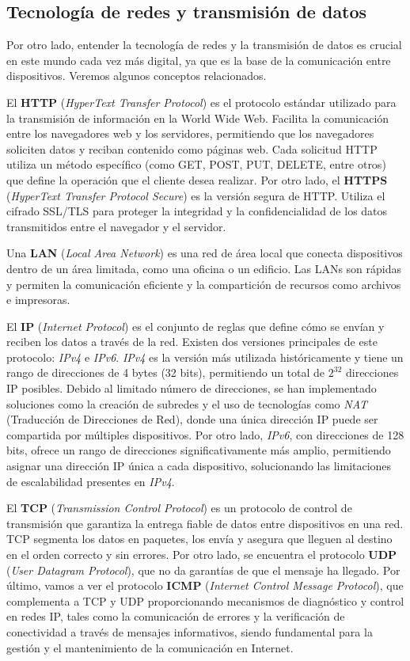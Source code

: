 \subsection{Tecnología de redes y transmisión de datos}

Por otro lado, entender la tecnología de redes y la transmisión de datos es crucial en este mundo cada vez más digital, ya que es la base de la comunicación entre dispositivos. Veremos algunos conceptos relacionados.

El \textbf{HTTP} (\textit{HyperText Transfer Protocol}) es el protocolo estándar utilizado para la transmisión de información en la World Wide Web. Facilita la comunicación entre los navegadores web y los servidores, permitiendo que los navegadores soliciten datos y reciban contenido como páginas web. Cada solicitud HTTP utiliza un método específico (como GET, POST, PUT, DELETE, entre otros) que define la operación que el cliente desea realizar. Por otro lado, el \textbf{HTTPS} (\textit{HyperText Transfer Protocol Secure}) es la versión segura de HTTP. Utiliza el cifrado SSL/TLS para proteger la integridad y la confidencialidad de los datos transmitidos entre el navegador y el servidor.

Una \textbf{LAN} (\textit{Local Area Network}) es una red de área local que conecta dispositivos dentro de un área limitada, como una oficina o un edificio. Las LANs son rápidas y permiten la comunicación eficiente y la compartición de recursos como archivos e impresoras.

El \textbf{IP} (\textit{Internet Protocol}) es el conjunto de reglas que define cómo se envían y reciben los datos a través de la red. Existen dos versiones principales de este protocolo: \textit{IPv4} e \textit{IPv6}. \textit{IPv4} es la versión más utilizada históricamente y tiene un rango de direcciones de 4 bytes (32 bits), permitiendo un total de $2^{32}$ direcciones IP posibles. Debido al limitado número de direcciones, se han implementado soluciones como la creación de subredes y el uso de tecnologías como \textit{NAT} (Traducción de Direcciones de Red), donde una única dirección IP puede ser compartida por múltiples dispositivos. Por otro lado, \textit{IPv6}, con direcciones de 128 bits, ofrece un rango de direcciones significativamente más amplio, permitiendo asignar una dirección IP única a cada dispositivo, solucionando las limitaciones de escalabilidad presentes en \textit{IPv4}.

El \textbf{TCP} (\textit{Transmission Control Protocol}) es un protocolo de control de transmisión que garantiza la entrega fiable de datos entre dispositivos en una red. TCP segmenta los datos en paquetes, los envía y asegura que lleguen al destino en el orden correcto y sin errores. Por otro lado, se encuentra el protocolo \textbf{UDP} (\textit{User Datagram Protocol}), que no da garantías de que el mensaje ha llegado. Por último, vamos a ver el protocolo \textbf{ICMP} (\textit{Internet Control Message Protocol}), que complementa a TCP y UDP proporcionando mecanismos de diagnóstico y control en redes IP, tales como la comunicación de errores y la verificación de conectividad a través de mensajes informativos, siendo fundamental para la gestión y el mantenimiento de la comunicación en Internet.


